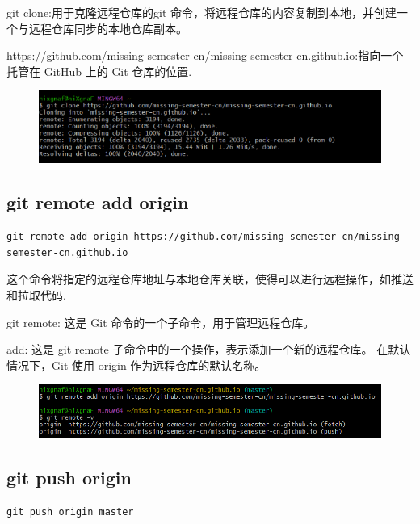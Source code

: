 \documentclass{article}
\begin{document}
\noindent git clone:用于克隆远程仓库的git 命令，将远程仓库的内容复制到本地，并创建一个与远程仓库同步的本地仓库副本。

\noindent https://github.com/missing-semester-cn/missing-semester-cn.github.io:指向一个托管在 GitHub 上的 Git 仓库的位置.

\begin{figure}[h]
    \centering
    \includegraphics[width=1\linewidth]{picture/gitclone.png}
\end{figure}

\subsection{git remote add origin}
\lstset{language=bash}
\begin{lstlisting}
git remote add origin https://github.com/missing-semester-cn/missing-semester-cn.github.io
\end{lstlisting}

\noindent 这个命令将指定的远程仓库地址与本地仓库关联，使得可以进行远程操作，如推送和拉取代码.

\noindent git remote: 这是 Git 命令的一个子命令，用于管理远程仓库。

\noindent add: 这是 git remote 子命令中的一个操作，表示添加一个新的远程仓库。
在默认情况下，Git 使用 origin 作为远程仓库的默认名称。

\begin{figure}[h]
    \centering
    \includegraphics[width=1\linewidth]{picture/remoteadd.png}
\end{figure}

\subsection{git push origin}
\lstset{language=bash}
\begin{lstlisting}
git push origin master
\end{lstlisting}
\end{document}
